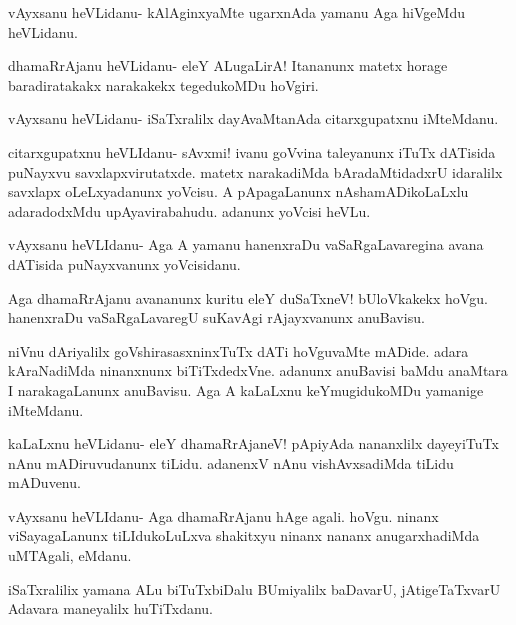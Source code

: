\documentclass{article}
\begin{document}
\begin{mng}%
vAyxsanu heVLidanu- kAlAginxyaMte ugarxnAda yamanu Aga hiVgeMdu 
heVLidanu.
\end{mng}

\begin{mng}%
dhamaRrAjanu heVLidanu- eleY ALugaLirA! Itananunx matetx horage 
baradiratakakx narakakekx tegedukoMDu hoVgiri.
\end{mng}

\begin{mng}%
vAyxsanu heVLidanu- iSaTxralilx dayAvaMtanAda citarxgupatxnu iMteMdanu.
\end{mng}

\begin{mng}%
citarxgupatxnu heVLIdanu- sAvxmi! ivanu goVvina taleyanunx iTuTx 
dATisida puNayxvu savxlapxvirutatxde. matetx narakadiMda 
bAradaMtidadxrU idaralilx savxlapx oLeLxyadanunx yoVcisu. A 
pApagaLanunx nAshamADikoLaLxlu adaradodxMdu upAyavirabahudu. adanunx 
yoVcisi heVLu.
\end{mng}

\begin{mng}%
vAyxsanu heVLIdanu- Aga A yamanu hanenxraDu vaSaRgaLavaregina avana 
dATisida puNayxvanunx yoVcisidanu.
\end{mng}

\begin{mng}%
Aga dhamaRrAjanu avananunx kuritu eleY duSaTxneV! bUloVkakekx hoVgu. 
hanenxraDu vaSaRgaLavaregU suKavAgi rAjayxvanunx anuBavisu.
\end{mng}

\begin{mng}%
niVnu dAriyalilx goVshirasasxninxTuTx dATi hoVguvaMte mADide. adara 
kAraNadiMda ninanxnunx biTiTxdedxVne. adanunx anuBavisi baMdu anaMtara 
I narakagaLanunx anuBavisu. Aga A kaLaLxnu keYmugidukoMDu yamanige 
iMteMdanu.
\end{mng}

\begin{mng}%
kaLaLxnu heVLidanu- eleY dhamaRrAjaneV! pApiyAda nananxlilx dayeyiTuTx 
nAnu mADiruvudanunx tiLidu. adanenxV nAnu vishAvxsadiMda tiLidu 
mADuvenu.
\end{mng}

\begin{mng}%
vAyxsanu heVLIdanu- Aga dhamaRrAjanu hAge agali. hoVgu. ninanx 
viSayagaLanunx tiLIdukoLuLxva shakitxyu ninanx nananx anugarxhadiMda 
uMTAgali, eMdanu.
\end{mng}

\begin{mng}%
iSaTxralilix yamana ALu biTuTxbiDalu BUmiyalilx baDavarU, 
jAtigeTaTxvarU Adavara maneyalilx huTiTxdanu.
\end{mng}
\end{document}
